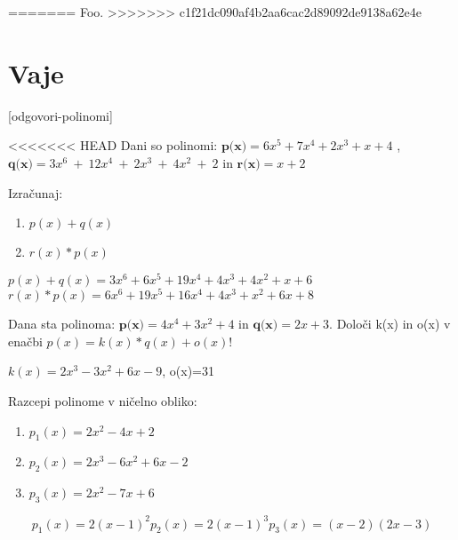 =======
Foo.
>>>>>>> c1f21dc090af4b2aa6cac2d89092de9138a62e4e

\section{Vaje}
\label{sec:polinomi-funkcije-vaje}


\def\datotekaOdgovori{odgovori-polinomi}

[\datotekaOdgovori]


\begin{vaja}
<<<<<<< HEAD
  Dani so polinomi: $\textbf{p(x)}=6x^5+7x^4+2x^3+x+4$ , 
$\textbf{q(x)}=3x^6~+~12x^4~+~2x^3~+~4x^2~+~2$ in $\textbf{r(x)}=x+2$

Izračunaj: 
\begin{enumerate}
\item $p(x)+q(x)$ 
\item $r(x)*p(x)$
\end{enumerate}

  \begin{odgovor}
    $p(x)+q(x)=3x^6+6x^5+19x^4+4x^3+4x^2+x+6$
$r(x)*p(x)= 6x^6+19x^5+16x^4+4x^3+x^2+6x+8$
  \end{odgovor}
\end{vaja}

\begin{vaja}
 Dana sta polinoma:  $\textbf{p(x)}=4x^4+3x^2+4$ in $\textbf{q(x)}=2x+3$. Določi k(x) in o(x) v enačbi $p(x)=k(x)*q(x)+o(x)$!

  \begin{odgovor}
    $k(x)=2x^3-3x^2+6x-9$, o(x)=31
  \end{odgovor}
\end{vaja}

\begin{vaja}
 Razcepi polinome v ničelno obliko:
\begin{enumerate}
\item $p_1(x)=2x^2-4x+2$
\item $p_2(x)= 2x^3-6x^2+6x-2$
\item $p_3(x)=2x^2-7x+6$
\end{enumerate}
  \begin{odgovor}
   \[
p_1(x)=2(x-1)^2
p_2(x)=2(x-1)^3
p_3(x)=(x-2)(2x-3)
\] 
 \end{odgovor}
\end{vaja}

